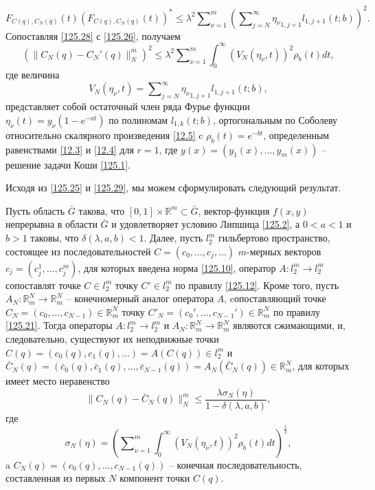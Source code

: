 \begin{equation}\label{125.28}
F_{C(q),C_N(q)}(t)(F_{C(q),C_N(q)}(t))^*\le \lambda^2   \sum\nolimits_{\nu=1}^m \left(\sum\nolimits_{j=N}^\infty  {\eta_\nu}_{1,j+1}l_{1,j+1}(t;b)\right)^2.
\end{equation}
Сопоставляя \eqref{125.28} с \eqref{125.26}, получаем
\begin{equation}\label{125.29}
(\|C_N(q)- C_N'(q)\|_N^m)^2\le \lambda^2\sum\nolimits_{\nu=1}^m\int_{0}^\infty\left(V_N(\eta_\nu,t)\right)^2\rho_b(t) dt,
\end{equation}
где величина
\begin{equation}\label{125.30}
V_N(\eta_\nu,t)= \sum\nolimits_{j=N}^\infty  {\eta_\nu}_{1,j+1}l_{1,j+1}(t;b),
\end{equation}
представляет собой остаточный член ряда Фурье функции $\eta_\nu(t)=y_\nu(1-e^{-at})$ по полиномам $l_{1,k}(t;b)$, ортогональным по Соболеву относительно скалярного произведения \eqref{12.5} c  $\rho_b(t)=e^{-bt}$, определенным равенствами \eqref{12.3} и \eqref{12.4} для $r=1$, где
$y(x)=(y_1(x),\ldots,y_m(x))$ -- решение задачи Коши  \eqref{125.1}.

Исходя из \eqref{125.25} и \eqref{125.29},  мы можем сформулировать следующий результат.
\begin{theorem}\label{th20} Пусть область $\bar G$ такова, что $[0,1]\times\mathbb{R}^m\subset  \bar G$, вектор-функция $f(x,y)$ непрерывна в области $\bar G$ и удовлетворяет условию Липшица \eqref{125.2}, а $0< a<1$ и $b>1$ таковы, что  $\delta(\lambda,a,b)<1$. Далее, пусть $l_2^m$ гильбертово пространство, состоящее из последовательностей $C=(c_0,\ldots,c_j,\ldots)$ $m$-мерных векторов $c_j=(c_j^1,\ldots,c_j^m)$, для которых введена норма \eqref{125.10}, оператор $A: l_2^m\to l_2^m$ сопоставлят точке $C\in l_2^m$ точку $C'\in l_2^m$ по правилу \eqref{125.12}. Кроме того, пусть $A_N:\mathbb{R}^N_m\to \mathbb{R}^N_m$ -- конечномерный аналог оператора $A$, cопоставляющий точке $C_N=(c_0,\ldots,c_{N-1})\in \mathbb{R}^N_m $ точку  $C'_N=(c_0',\ldots,c_{N-1}')\in \mathbb{R}^N_m $ по правилу \eqref{125.21}.
	Тогда операторы $A: l_2^m\to l_2^m$ и $A_N:\mathbb{R}^N_m\to \mathbb{R}^N_m$ являются сжимающими, и, следовательно, существуют  их неподвижные точки $C(q)=(c_0(q),c_1(q),\ldots)=A(C(q))\in l_2^m$ и $\bar C_N(q)=(\bar c_0(q),\bar c_1(q),\ldots,\bar c_{N-1}(q))=A_N(\bar C_N(q))\in \mathbb{R}^N_m$, для которых имеет место неравенство
	\begin{equation}\label{125.31}
	\|C_N(q)-\bar C_N(q)\|_N^m\le \frac{\lambda \sigma_N(\eta)}{1-\delta(\lambda,a,b)},
	\end{equation}
	где
	\begin{equation}\label{125.32}
	\sigma_N(\eta)=\left(\sum\nolimits_{\nu=1}^m\int_{0}^\infty\left(V_N(\eta_\nu,t)\right)^2\rho_b(t) dt\right)^\frac12,
	\end{equation}
	a $C_N(q)=(c_0(q),\ldots,c_{N-1}(q))$ -- конечная последовательность, составленная из первых $N$ компонент точки  $C(q)$.
\end{theorem}

